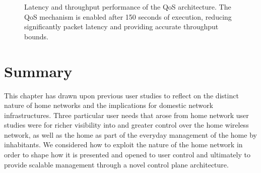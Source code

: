 \begin{figure} \centering
 \caption[QoS mechanism Latency and throughput evaluation]{\label{f:homework:performance-qos} Latency and throughput performance
  of the QoS architecture. The QoS mechanism is enabled after 150 seconds of
  execution, reducing significantly packet latency and providing accurate
  throughput bounds.}
\end{figure}

\section{Summary} \label{s:conclusion}

This chapter has drawn upon previous user studies to reflect on the distinct
nature of home networks and the implications for domestic network
infrastructures.  Three particular user needs that arose from home network user
studies were for richer visibility into and greater control over the home
wireless network, as well as the home as part of the everyday management of the
home by inhabitants.  We  considered how to exploit the nature of the home
network in order to shape how it is presented and opened to user control and ultimately
to provide scalable management through a novel control plane architecture.  

